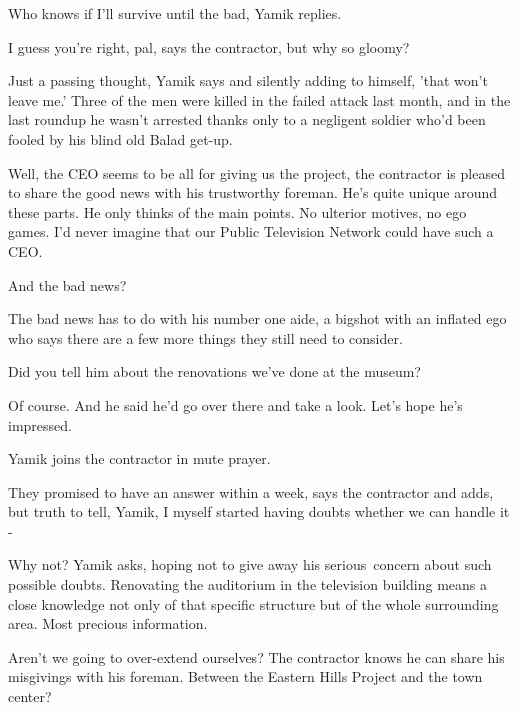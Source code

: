\documentclass[twoside,11pt]{book}
\begin{document}
{\textquotedbl}Who knows if I'll survive until the bad,{\textquotedbl} Yamik replies.{\ }

{\textquotedbl}I guess you're right, pal,{\textquotedbl} says the contractor, {\textquotedbl}but why so
gloomy?{\textquotedbl} 

{\textquotedbl}Just a passing thought,{\textquotedbl} Yamik says and silently adding to himself, 'that won't leave me.'
Three of the men were killed in the failed attack last month, and in the last roundup he wasn't arrested thanks only to
a negligent soldier who'd been fooled by his blind old Balad get-up. 

{\textquotedbl}Well, the CEO seems to be all for giving us the project,{\textquotedbl} the contractor is pleased to
share the good news with his trustworthy foreman. {\textquotedbl}He's quite unique around these parts. He only thinks
of the main points. No ulterior motives, no ego games. I'd never imagine that our Public Television Network could have
such a CEO.{\textquotedbl}

{\textquotedbl}And the bad news?{\textquotedbl} 

{\textquotedbl}The bad news has to do with his number one aide, a bigshot with an inflated ego who says there are a few
more things they still need to consider.{\textquotedbl} 

{\textquotedbl}Did you tell him about the renovations we've done at the museum?{\textquotedbl} 

{\textquotedbl}Of course. And he said he'd go over there and take a look. Let's hope he's impressed.{\textquotedbl} 

Yamik joins the contractor in mute prayer. 

{\textquotedbl}They promised to have an answer within a week,{\textquotedbl} says the contractor and adds,
{\textquotedbl}but truth to tell, Yamik, I myself started having doubts whether we can handle it -{\textquotedbl} 

{\textquotedbl}Why not?{\textquotedbl} Yamik asks, hoping not to give away his serious{\ }concern about
such possible doubts. Renovating the auditorium in the television building means a close knowledge not only of that
specific structure but of the whole surrounding area. Most precious information. ~

{\textquotedbl}Aren't we going to over-extend ourselves?{\textquotedbl} The contractor knows he can share his misgivings
with his foreman. {\textquotedbl}Between the Eastern Hills Project and the town center?{\textquotedbl} 
\end{document}
